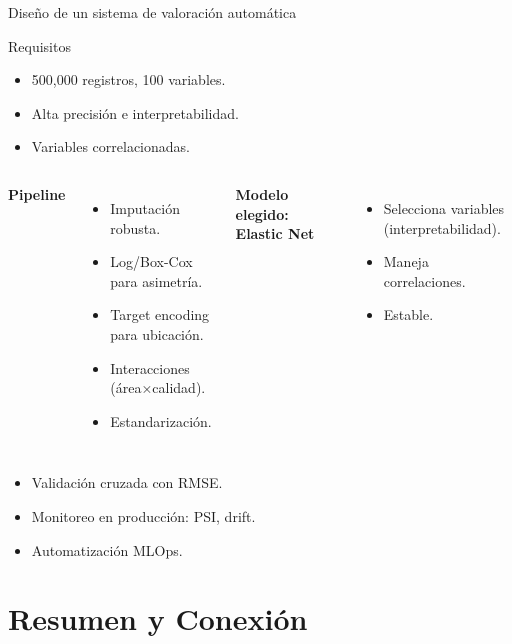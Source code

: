 \documentclass[aspectratio=169, 10pt, xcolor=table]{beamer}
\begin{document}
\begin{frame}{Diseño de un sistema de valoración automática}
    \begin{block}{Requisitos}
        \begin{itemize}
            \item 500,000 registros, 100 variables.
            \item Alta precisión e interpretabilidad.
            \item Variables correlacionadas.
        \end{itemize}
    \end{block}
    \begin{columns}[t]
        \textbf{Pipeline}
        \begin{itemize}
            \item Imputación robusta.
            \item Log/Box-Cox para asimetría.
            \item Target encoding para ubicación.
            \item Interacciones (área×calidad).
            \item Estandarización.
        \end{itemize}
        \textbf{Modelo elegido: Elastic Net}
        \begin{itemize}
            \item Selecciona variables (interpretabilidad).
            \item Maneja correlaciones.
            \item Estable.
        \end{itemize}
    \end{columns}
    \vspace{0.2cm}
    \begin{itemize}
        \item Validación cruzada con RMSE.
        \item Monitoreo en producción: PSI, drift.
        \item Automatización MLOps.
    \end{itemize}
\end{frame}

\section{Resumen y Conexión}
\end{document}
